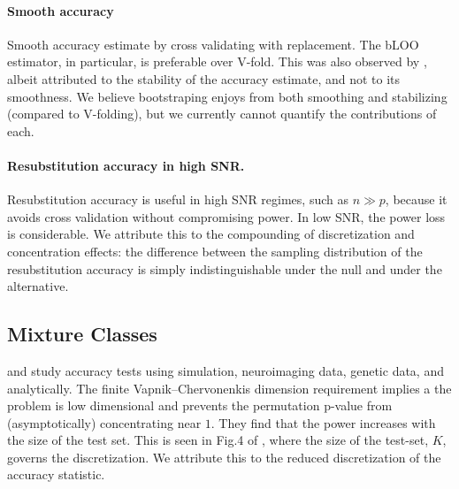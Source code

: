 \documentclass[onecolumn,draftclsnofoot]{IEEEtran}
\begin{document}
\paragraph{Smooth accuracy}
Smooth accuracy estimate by cross validating with replacement. 
The bLOO estimator, in particular, is preferable over V-fold.
This was also observed by \cite{yu2007two}, albeit attributed to the stability of the accuracy estimate, and not to its smoothness. 
We believe bootstraping enjoys from both smoothing and stabilizing (compared to V-folding), but we currently cannot quantify the contributions of each. 


\paragraph{Resubstitution accuracy in high SNR.} 
Resubstitution accuracy is useful in high SNR regimes, such as $n \gg p$, because it avoids cross validation without compromising power. 
In low SNR, the power loss is considerable. 
We attribute this to the compounding of discretization and concentration effects: the difference between the sampling distribution of the resubstitution accuracy is simply indistinguishable under the null and under the alternative. 



\subsection{Mixture Classes}

\cite{golland_permutation_2003} and \cite{golland_permutation_2005} study accuracy tests using simulation, neuroimaging data, genetic data, and analytically.
The finite Vapnik–Chervonenkis dimension requirement \cite[Sec 4.3]{golland_permutation_2005} implies a the problem is low dimensional and prevents the permutation p-value from (asymptotically) concentrating near $1$. 
They find that the power increases with the size of the test set.
This is seen in Fig.4 of \cite{golland_permutation_2005}, where the size of the test-set, $K$, governs the discretization. 
We attribute this to the reduced discretization of the accuracy statistic.
\end{document}
